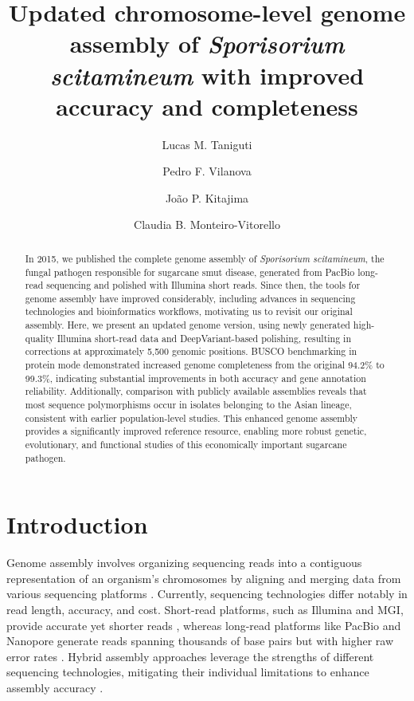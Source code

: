 \documentclass[Journal,letterpaper]{theme}
\begin{document}
\title{Updated chromosome-level genome assembly of
\textit{Sporisorium scitamineum} with improved accuracy and completeness}

\author[1]{Lucas M. Taniguti}
\author[2]{Pedro F. Vilanova}
\author[1]{João P. Kitajima}
\author[2]{Claudia B. Monteiro-Vitorello }


\maketitle

\begin{abstract}
  In 2015, we published the complete genome assembly of
  \textit{Sporisorium scitamineum}, the fungal pathogen responsible
  for sugarcane smut disease, generated from PacBio
  long-read sequencing and polished with Illumina short reads. Since
  then, the tools for genome assembly have improved considerably,
  including advances in sequencing technologies and bioinformatics
  workflows, motivating us to revisit our original assembly. Here, we
  present an updated genome version, using newly
  generated high-quality Illumina short-read data and
  DeepVariant-based polishing, resulting in
  corrections at approximately 5,500 genomic positions. BUSCO
  benchmarking in protein mode demonstrated increased genome
  completeness from the original 94.2\%
  to 99.3\%, indicating substantial improvements in both accuracy and
  gene annotation reliability. Additionally, comparison with publicly
  available assemblies reveals that most sequence polymorphisms occur
  in isolates belonging to the Asian lineage, consistent with earlier
  population-level studies.
  This enhanced genome assembly provides a significantly improved
  reference resource, enabling more robust genetic, evolutionary, and
  functional studies of this economically important sugarcane pathogen.
\end{abstract}

\section*{Introduction}

Genome assembly involves organizing sequencing reads into a
contiguous representation of an organism's chromosomes by aligning
and merging data from various sequencing platforms
\cite{BASANTANI201733,Baker2012}. Currently, sequencing technologies
differ notably in read length, accuracy, and cost. Short-read
platforms, such as Illumina and MGI, provide accurate yet shorter
reads \cite{giab014}, whereas long-read platforms like PacBio and
Nanopore generate reads spanning thousands of base pairs but with
higher raw error rates \cite{Jain2018,Karst2021}. Hybrid assembly
approaches leverage the strengths of different sequencing
technologies, mitigating their individual limitations to enhance
assembly accuracy \cite{Chen2020}.
\end{document}
